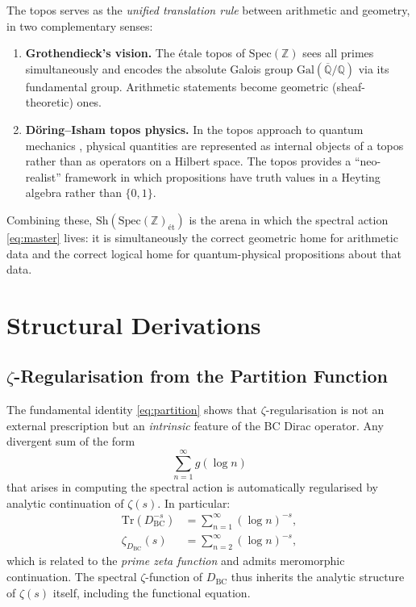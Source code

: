 \documentclass[11pt,a4paper]{article}
\begin{document}
The topos serves as the \emph{unified translation rule} between arithmetic
and geometry, in two complementary senses:

\begin{enumerate}
  \item \textbf{Grothendieck's vision.} The \'etale topos of
    $\mathrm{Spec}(\mathbb{Z})$ sees all primes simultaneously and encodes
    the absolute Galois group $\mathrm{Gal}(\overline{\mathbb{Q}}/\mathbb{Q})$
    via its fundamental group. Arithmetic statements become geometric
    (sheaf-theoretic) ones.

  \item \textbf{D\"oring--Isham topos physics.} In the topos approach to
    quantum mechanics \cite{DoeringIsham2008}, physical quantities are
    represented as internal objects of a topos rather than as operators on a
    Hilbert space. The topos provides a ``neo-realist'' framework in which
    propositions have truth values in a Heyting algebra rather than
    $\{0,1\}$.
\end{enumerate}

Combining these, $\mathrm{Sh}(\mathrm{Spec}(\mathbb{Z})_{\text{\'et}})$
is the arena in which the spectral action \eqref{eq:master} lives: it is
simultaneously the correct geometric home for arithmetic data and the
correct logical home for quantum-physical propositions about that data.

\section{Structural Derivations}
\label{sec:derivations}

\subsection{$\zeta$-Regularisation from the Partition Function}
\label{sec:zetareg}

The fundamental identity \eqref{eq:partition} shows that $\zeta$-regularisation
is not an external prescription but an \emph{intrinsic} feature of the BC
Dirac operator. Any divergent sum of the form
\[
  \sum_{n=1}^{\infty} g(\log n)
\]
that arises in computing the spectral action is automatically regularised by
analytic continuation of $\zeta(s)$. In particular:
\begin{align}
  \mathrm{Tr}(D_{\mathrm{BC}}^{-s})
  &= \sum_{n=1}^{\infty} (\log n)^{-s}, \label{eq:Dzetafn}\\
  \zeta_{D_{\mathrm{BC}}}(s)
  &= \sum_{n=2}^{\infty} (\log n)^{-s},
\end{align}
which is related to the \emph{prime zeta function} and admits meromorphic
continuation. The spectral $\zeta$-function of $D_{\mathrm{BC}}$ thus
inherits the analytic structure of $\zeta(s)$ itself, including the
functional equation.
\end{document}
